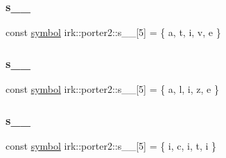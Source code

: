\mbox{\label{namespaceirk_1_1porter2_a775975e6472f53e7604d60c98f750372}} 
\subsubsection{\texorpdfstring{s\+\_\+\_}{s\_6\_1}}
{\footnotesize\ttfamily const \mbox{\hyperlink{namespaceirk_1_1porter2_afd04c4eb58a1dabcf8f3ab2d7e9f9ed5}{symbol}} irk\+::porter2\+::s\+\_\+\_\mbox{[}5\mbox{]} = \{ \textquotesingle{}a\textquotesingle{}, \textquotesingle{}t\textquotesingle{}, \textquotesingle{}i\textquotesingle{}, \textquotesingle{}v\textquotesingle{}, \textquotesingle{}e\textquotesingle{} \}\hspace{0.3cm}{\ttfamily [static]}}

\mbox{\label{namespaceirk_1_1porter2_a6540eec9911e60f67fcc71d797abea12}} 
\subsubsection{\texorpdfstring{s\+\_\+\_}{s\_6\_2}}
{\footnotesize\ttfamily const \mbox{\hyperlink{namespaceirk_1_1porter2_afd04c4eb58a1dabcf8f3ab2d7e9f9ed5}{symbol}} irk\+::porter2\+::s\+\_\+\_\mbox{[}5\mbox{]} = \{ \textquotesingle{}a\textquotesingle{}, \textquotesingle{}l\textquotesingle{}, \textquotesingle{}i\textquotesingle{}, \textquotesingle{}z\textquotesingle{}, \textquotesingle{}e\textquotesingle{} \}\hspace{0.3cm}{\ttfamily [static]}}

\mbox{\label{namespaceirk_1_1porter2_a50329184128fbafc6f9218e641691fd2}} 
\subsubsection{\texorpdfstring{s\+\_\+\_}{s\_6\_3}}
{\footnotesize\ttfamily const \mbox{\hyperlink{namespaceirk_1_1porter2_afd04c4eb58a1dabcf8f3ab2d7e9f9ed5}{symbol}} irk\+::porter2\+::s\+\_\+\_\mbox{[}5\mbox{]} = \{ \textquotesingle{}i\textquotesingle{}, \textquotesingle{}c\textquotesingle{}, \textquotesingle{}i\textquotesingle{}, \textquotesingle{}t\textquotesingle{}, \textquotesingle{}i\textquotesingle{} \}\hspace{0.3cm}{\ttfamily [static]}}

